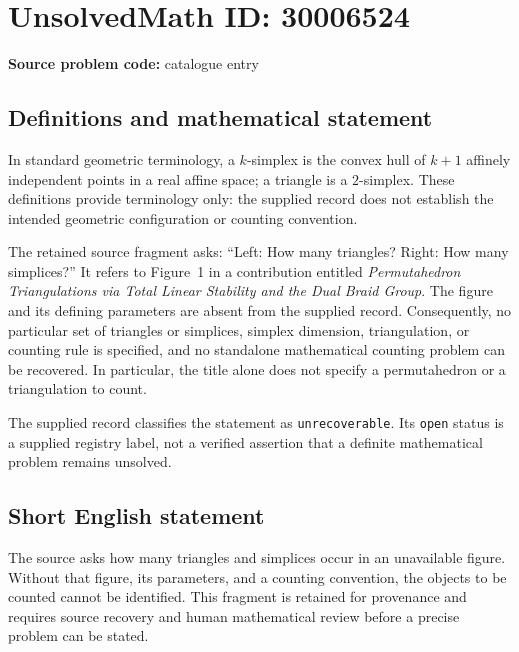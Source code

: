 \documentclass[11pt]{article}
\begin{document}
\section*{UnsolvedMath ID: 30006524}
\textbf{Source problem code:} catalogue entry
\subsection{Definitions and mathematical statement}
In standard geometric terminology, a \(k\)-simplex is the convex hull of \(k+1\) affinely independent points in a real affine space; a triangle is a \(2\)-simplex. These definitions provide terminology only: the supplied record does not establish the intended geometric configuration or counting convention.

The retained source fragment asks: ``Left: How many triangles? Right: How many simplices?'' It refers to Figure~1 in a contribution entitled \emph{Permutahedron Triangulations via Total Linear Stability and the Dual Braid Group}. The figure and its defining parameters are absent from the supplied record. Consequently, no particular set of triangles or simplices, simplex dimension, triangulation, or counting rule is specified, and no standalone mathematical counting problem can be recovered. In particular, the title alone does not specify a permutahedron or a triangulation to count.

The supplied record classifies the statement as \texttt{unrecoverable}. Its \texttt{open} status is a supplied registry label, not a verified assertion that a definite mathematical problem remains unsolved.
\subsection{Short English statement}
The source asks how many triangles and simplices occur in an unavailable figure. Without that figure, its parameters, and a counting convention, the objects to be counted cannot be identified. This fragment is retained for provenance and requires source recovery and human mathematical review before a precise problem can be stated.
\end{document}
